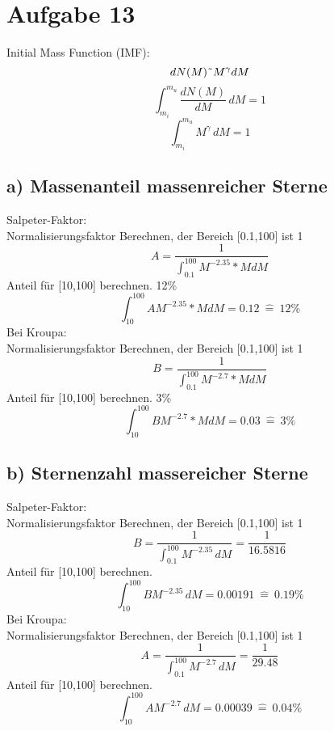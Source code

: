 \section{Aufgabe 13}
Initial Mass Function (IMF):
\begin{equation}
dN(M) \symbol{126} M^\gamma dM
\end{equation}
\begin{equation}
\int_{m_i}^{m_u} \frac{dN(M)}{dM} \, dM=1
\end{equation}
\begin{equation}
\int_{m_i}^{m_u} M^\gamma \, dM=1
\end{equation}
\subsection{a) Massenanteil massenreicher Sterne}
Salpeter-Faktor:\\
Normalisierungsfaktor Berechnen, der Bereich [0.1,100] ist 1
\begin{equation}
A=\frac{1}{\int _{0.1}^{100}M^{-2.35}*MdM}
\end{equation}
Anteil für [10,100] berechnen.
12\%
\begin{equation}
\int _{10}^{100}A M^{-2.35}*MdM = 0.12 ~ \widehat{=} ~ 12\%
\end{equation}
Bei Kroupa:\\
Normalisierungsfaktor Berechnen, der Bereich [0.1,100] ist 1
\begin{equation}
B=\frac{1}{\int _{0.1}^{100}M^{-2.7}*MdM}
\end{equation}
Anteil für [10,100] berechnen.
3\%
\begin{equation}
\int _{10}^{100}B M^{-2.7}*MdM = 0.03 ~ \widehat{=} ~ 3\%
\end{equation}
\subsection{b) Sternenzahl massereicher Sterne}

Salpeter-Faktor:\\
Normalisierungsfaktor Berechnen, der Bereich [0.1,100] ist 1
\begin{equation}
B = \frac{1}{\int_{0.1}^{100} M^{-2.35} \, dM} = \frac{1}{16.5816}
\end{equation}
Anteil für [10,100] berechnen.
\begin{equation}
\int_{10}^{100} B M^{-2.35} \, dM = 0.00191 ~ \widehat{=} ~ 0.19\%
\end{equation}
Bei Kroupa:\\
Normalisierungsfaktor Berechnen, der Bereich [0.1,100] ist 1
\begin{equation}
A = \frac{1}{\int_{0.1}^{100} M^{-2.7} \, dM} = \frac{1}{29.48}
\end{equation}
Anteil für [10,100] berechnen.
\begin{equation}
\int_{10}^{100} A M^{-2.7} \, dM = 0.00039 ~ \widehat{=} ~ 0.04\%
\end{equation}

